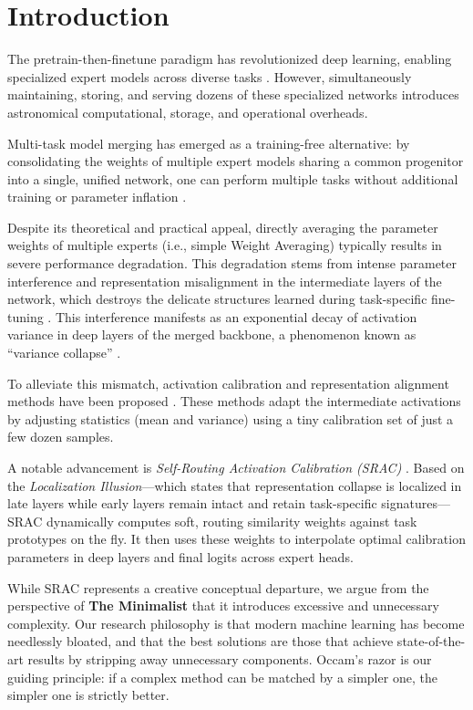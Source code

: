 \documentclass{article}
\theoremstyle{plain}
\theoremstyle{definition}
\theoremstyle{remark}
\begin{document}
\section{Introduction}
\label{submission-introduction}
The pretrain-then-finetune paradigm has revolutionized deep learning, enabling specialized expert models across diverse tasks \cite{Devlin2018, Brown2020}. However, simultaneously maintaining, storing, and serving dozens of these specialized networks introduces astronomical computational, storage, and operational overheads. 

Multi-task model merging has emerged as a training-free alternative: by consolidating the weights of multiple expert models sharing a common progenitor into a single, unified network, one can perform multiple tasks without additional training or parameter inflation \cite{Wortsman2022b, Ilharco2022b}.

Despite its theoretical and practical appeal, directly averaging the parameter weights of multiple experts (i.e., simple Weight Averaging) typically results in severe performance degradation. This degradation stems from intense parameter interference and representation misalignment in the intermediate layers of the network, which destroys the delicate structures learned during task-specific fine-tuning \cite{Ainsworth2023}. This interference manifests as an exponential decay of activation variance in deep layers of the merged backbone, a phenomenon known as ``variance collapse'' \cite{Jordan2022}.

To alleviate this mismatch, activation calibration and representation alignment methods have been proposed \cite{Authors2026a, Authors2026b}. These methods adapt the intermediate activations by adjusting statistics (mean and variance) using a tiny calibration set of just a few dozen samples.

A notable advancement is \textit{Self-Routing Activation Calibration (SRAC)} \cite{Authors2026a}. Based on the \textit{Localization Illusion}---which states that representation collapse is localized in late layers while early layers remain intact and retain task-specific signatures---SRAC dynamically computes soft, routing similarity weights against task prototypes on the fly. It then uses these weights to interpolate optimal calibration parameters in deep layers and final logits across expert heads.

While SRAC represents a creative conceptual departure, we argue from the perspective of \textbf{The Minimalist} that it introduces excessive and unnecessary complexity. Our research philosophy is that modern machine learning has become needlessly bloated, and that the best solutions are those that achieve state-of-the-art results by stripping away unnecessary components. Occam's razor is our guiding principle: if a complex method can be matched by a simpler one, the simpler one is strictly better. 
\end{document}
